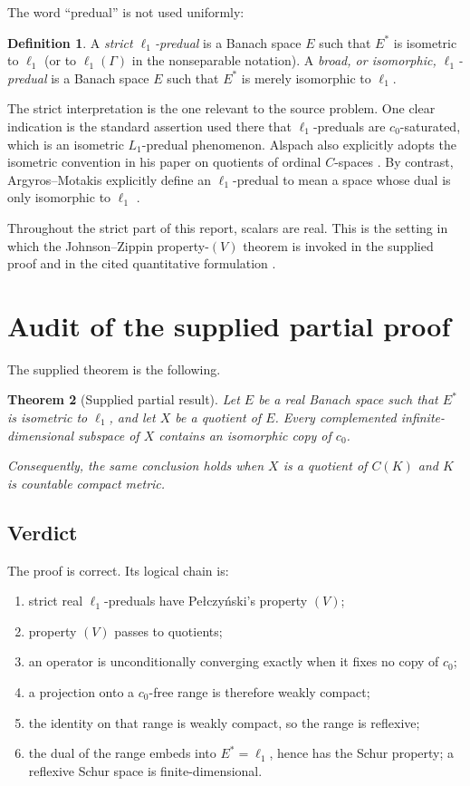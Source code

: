 \documentclass[11pt]{article}
\newtheorem{theorem}{Theorem}[section]
\theoremstyle{definition}
\newtheorem{definition}[theorem]{Definition}
\begin{document}
The word ``predual'' is not used uniformly:

\begin{definition}
A \emph{strict $\ell_1$-predual} is a Banach space $E$ such that $E^*$ is
isometric to $\ell_1$ (or to $\ell_1(\Gamma)$ in the nonseparable notation).
A \emph{broad, or isomorphic, $\ell_1$-predual} is a Banach space $E$ such that
$E^*$ is merely isomorphic to $\ell_1$.
\end{definition}

The strict interpretation is the one relevant to the source problem.  One
clear indication is the standard assertion used there that $\ell_1$-preduals
are $c_0$-saturated, which is an isometric $L_1$-predual phenomenon.  Alspach
also explicitly adopts the isometric convention in his paper on quotients of
ordinal $C$-spaces \cite{Alspach1993}.  By contrast, Argyros--Motakis explicitly
define an $\ell_1$-predual to mean a space whose dual is only isomorphic to
$\ell_1$ \cite[p.~36]{ArgyrosMotakis2016}.

Throughout the strict part of this report, scalars are real.  This is the
setting in which the Johnson--Zippin property-$(V)$ theorem is invoked in the
supplied proof and in the cited quantitative formulation
\cite[Theorem~4.2]{Krulisova2015}.

\section{Audit of the supplied partial proof}

The supplied theorem is the following.

\begin{theorem}[Supplied partial result]\label{thm:supplied}
Let $E$ be a real Banach space such that $E^*$ is isometric to $\ell_1$, and
let $X$ be a quotient of $E$.  Every complemented infinite-dimensional
subspace of $X$ contains an isomorphic copy of $c_0$.

Consequently, the same conclusion holds when $X$ is a quotient of $C(K)$ and
$K$ is countable compact metric.
\end{theorem}

\subsection*{Verdict}
The proof is correct.  Its logical chain is:
\begin{enumerate}
\item strict real $\ell_1$-preduals have Pe\l czy\'nski's property $(V)$;
\item property $(V)$ passes to quotients;
\item an operator is unconditionally converging exactly when it fixes no copy
      of $c_0$;
\item a projection onto a $c_0$-free range is therefore weakly compact;
\item the identity on that range is weakly compact, so the range is reflexive;
\item the dual of the range embeds into $E^*=\ell_1$, hence has the Schur
      property; a reflexive Schur space is finite-dimensional.
\end{enumerate}
\end{document}
